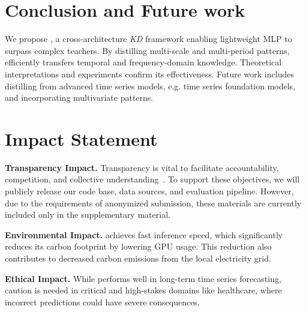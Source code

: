 
\section{Conclusion and Future work}

We propose \method{}, a cross-architecture \textit{KD} framework enabling lightweight MLP to surpass complex teachers. By distilling multi-scale and multi-period patterns, \method{} efficiently transfers temporal and frequency-domain knowledge. Theoretical interpretations and experiments confirm its effectiveness. Future work includes distilling from advanced time series models, e.g. time series foundation models, and incorporating multivariate patterns.



\clearpage
\section{Impact Statement}

\textbf{Transparency Impact.}  
Transparency is vital to facilitate accountability, competition, and collective understanding~\cite{bommasani2024foundation}. To support these objectives, we will publicly release our code base, data sources, and evaluation pipeline. However, due to the requirements of anonymized submission, these materials are currently included only in the supplementary material.

\textbf{Environmental Impact.}  
\method{} achieves fast inference speed, which significantly reduces its carbon footprint by lowering GPU usage. This reduction also contributes to decreased carbon emissions from the local electricity grid.

\textbf{Ethical Impact.}  
While \method{} performs well in long-term time series forecasting, caution is needed in critical and high-stakes domains like healthcare, where incorrect predictions could have severe consequences.



